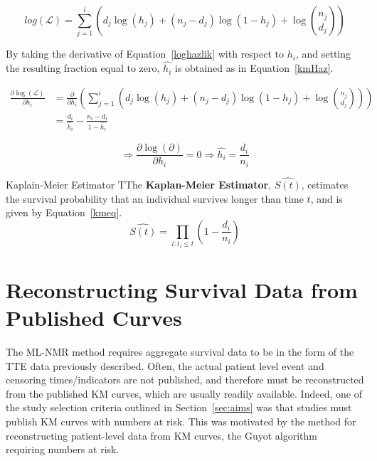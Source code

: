 \begin{equation}
    log(\mathcal{L}) = \sum_{j=1}^i \left(d_j\log(h_j)+(n_j-d_j)\log(1-h_j) + \log \binom{n_j}{d_j}\right)
    \label{loghazlik}
\end{equation}

By taking the derivative of Equation~\ref{loghazlik} with respect to $h_i$, and setting the resulting fraction equal to zero, $\hat{h_i}$ is obtained as in Equation~\ref{kmHaz}.

\begin{align}
    \frac{\partial \log(\mathcal{L})}{\partial h_i} &= \frac{\partial}{\partial h_i}\left(\sum_{j=1}^i \left(d_j\log(h_j)+(n_j-d_j)\log(1-h_j) + \log \binom{n_j}{d_j}\right)\right) \\
    &= \frac{d_i}{\hat{h_i}} - \frac{n_i - d_i}{1 - \hat{h_i}}
\end{align}

\begin{equation}
    \Rightarrow \frac{\partial \log (\partial )}{\partial h_i} = 0 \Rightarrow \hat{h_i} = \frac{d_i}{n_i}
    \label{kmHaz}
\end{equation}

\begin{definition}{Kaplain-Meier Estimator}
    TThe \textbf{Kaplan-Meier Estimator}, $\hat{S(t)}$, estimates the survival probability that an individual survives longer than time $t$, and is given by Equation~\ref{kmeq}. 
\begin{equation}
    \hat{S(t)} = \prod_{i:t_i \leq t}\left(1 - \frac{d_i}{n_i}\right)
    \label{kmeq}
\end{equation}
\end{definition}

\section{Reconstructing Survival Data from Published Curves}
The ML-NMR method requires aggregate survival data to be in the form of the TTE data previously described. Often, the actual patient level event and censoring times/indicators are not published, and therefore must be reconstructed from the published KM curves, which are usually readily available. Indeed, one of the study selection criteria outlined in Section~\ref{sec:aims} was that studies must publish KM curves with numbers at risk. This was motivated by the method for reconstructing patient-level data from KM curves, the Guyot algorithm~\cite{guyotipd} requiring numbers at risk.

